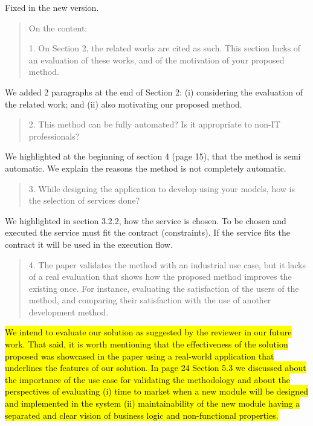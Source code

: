 \documentclass[12pt,a4wide]{article}
\begin{document}
\noindent 
Fixed in the new version.


\begin{quotation}\sf\footnotesize

\noindent On the content: 

1.	On Section 2, the related works are cited as such. This section lucks of an evaluation of these works, and of the motivation of your proposed method. 
\end{quotation}

\noindent 
We added 2 paragraphs at the end of Section 2: (i) considering the evaluation of the related work; and (ii) also motivating our proposed method. 
\begin{quotation}\sf\footnotesize

2.	This method can be fully automated? Is it appropriate to non-IT professionals? 
\end{quotation}

\noindent 
We highlighted at the beginning of section 4 (page 15), that the method is semi automatic. We explain the reasons the method is not completely automatic.

\begin{quotation}\sf\footnotesize

3.	While designing the application to develop using your models, how is the selection of services done? 
\end{quotation}

\noindent 
We highlighted in section 3.2.2, how the service is chosen.  To be chosen and executed the service must fit the contract (constraints). If the service fits the contract it will be used in the execution flow.

\begin{quotation}\sf\footnotesize

4.	The paper validates the method with an industrial use case, but it lacks of a real evaluation that shows how the proposed method improves the existing once. For instance, evaluating the satisfaction of the users of the method, and comparing their satisfaction with the use of another development method. 
\end{quotation}

\noindent 
\hl{We intend to evaluate our solution as suggested by the reviewer in our future work. That said, it is worth mentioning that the effectiveness of the solution proposed was showcased in the paper using a real-world application that underlines the features of our solution. In page 24 Section 5.3  we discussed about the importance of the use case for validating the methodology and about the perspectives of evaluating (i) time to market when a new module will be designed and implemented in the system (ii) maintainability of the new module having a separated and clear vision of business logic and non-functional properties.}
\end{document}
